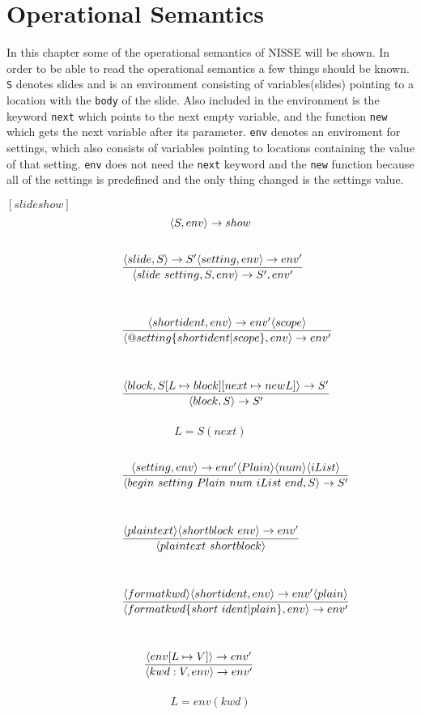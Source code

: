 \chapter{Operational Semantics}
In this chapter some of the operational semantics of NISSE will be shown. In order to be able to read the operational semantics a few things should be known. \texttt{S} denotes slides and is an environment consisting of variables(slides) pointing to a location with the \texttt{body} of the slide. Also included in the environment is the keyword \texttt{next} which points to the next empty variable, and the function \texttt{new} which gets the next variable after its parameter. \texttt{env} denotes an enviroment for settings, which also consists of variables pointing to locations containing the value of that setting. \texttt{env} does not need the \texttt{next} keyword and the \texttt{new} function because all of the settings is predefined and the only thing changed is the settings value.

$[slideshow]$
\[ \langle S, env \rangle \rightarrow show \]

\noindent{$[specification]$}
\[ \condinfrule{\langle slide, S \rangle \ra S' \langle setting, env \rangle \ra env'} { \langle slide~setting, S, env \rangle \ra S', env'}{} \]

\noindent{$[setting]$}
\[ \condinfrule{\langle shortident, env \rangle \ra env' \langle scope \rangle} { \langle @ setting \{ shortident | scope \}, env \rangle \ra env'}{} \]

\noindent{$[slide]$}
\[ \condinfrule{\langle block, S[L \mapsto block] [next \mapsto new L] \rangle \ra S'} { \langle block, S \rangle \ra S'}{} \]
\[ L = S(next)\]

\noindent{$[block]$}
\[ \condinfrule{\langle setting, env \rangle \ra env' \langle Plain \rangle \langle num \rangle \langle iList \rangle} { \langle begin~setting~Plain~num~iList~end, S \rangle \ra S'}{} \]

\noindent{$[plain]$}
\[ \condinfrule{\langle plaintext \rangle \langle shortblock~env \rangle \ra env'} { \langle plaintext~shortblock \rangle }{} \]

\noindent{$[shortblock]$}
\[ \condinfrule{\langle formatkwd \rangle \langle shortident, env \rangle \ra env' \langle plain \rangle} { \langle formatkwd \{short~ident | plain\}, env \rangle \ra env'}{} \]

\noindent{$[shortident]$}
\[ \condinfrule{\langle env [L \mapsto V] \rangle \ra env'} { \langle kwd : V, env \rangle \ra env'}{} \]
\[ L = env(kwd)\]